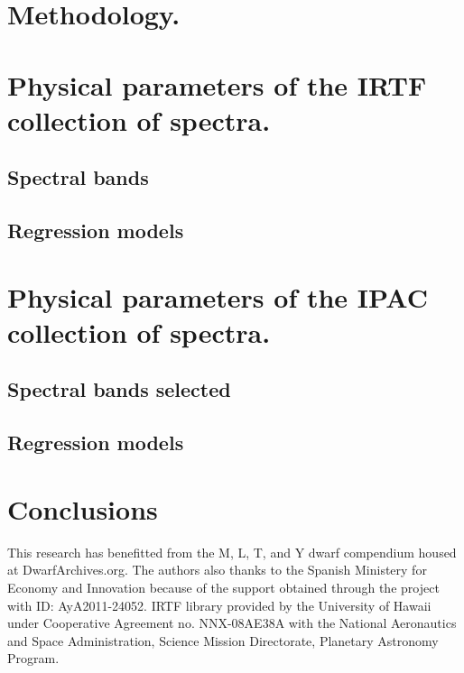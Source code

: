 \documentclass[printer]{aa}
\begin{document}





\section{Methodology. \label{meth}}


\section{Physical parameters of the IRTF collection of spectra.}
%
\subsection{Spectral bands}

\subsection{Regression models}


\section{Physical parameters of the IPAC collection of spectra.}
%
\subsection{Spectral bands selected}

\subsection{Regression models}


\section{Conclusions}

\begin{acknowledgements}
This research has benefitted from the M, L, T, and Y dwarf compendium housed at DwarfArchives.org.
The authors also thanks to the Spanish Ministery for Economy and Innovation because of the 
support obtained through the project with ID: AyA2011-24052. IRTF library provided by the 
University of Hawaii under Cooperative Agreement no. NNX-08AE38A with the National 
Aeronautics and Space Administration, Science Mission Directorate, Planetary Astronomy Program.
\end{acknowledgements}


{}

\end{document}
